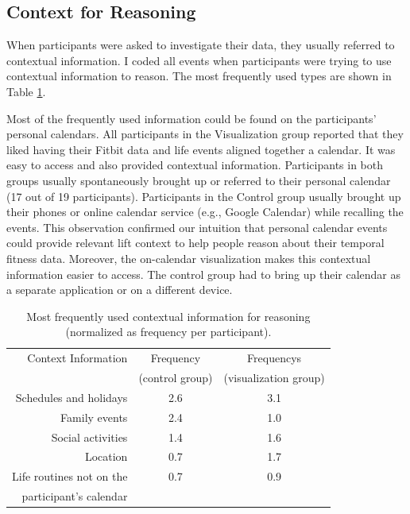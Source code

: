 \documentclass[12pt,oneside]{book}
\begin{document}
\subsection{Context for Reasoning}
When participants were asked to investigate their data, they usually referred to contextual information. I coded all events when participants were trying to use contextual information to reason. The most frequently used types are shown in Table \ref{table:context_use}.

Most of the frequently used information could be found on the participants' personal calendars. All participants in the Visualization group reported that they liked having their Fitbit data and life events aligned together a calendar. It was easy to access and also provided contextual information. Participants in both groups usually spontaneously brought up or referred to their personal calendar (17 out of 19 participants). Participants in the Control group usually brought up their phones or online calendar service (e.g., Google Calendar) while recalling the events. This observation confirmed our intuition that personal calendar events could provide relevant lift context to help people reason about their temporal fitness data. Moreover, the on-calendar visualization makes this contextual information easier to access. The control group had to bring up their calendar as a separate application or on a different device.

\begin{table} [h]
\begin{center}
\begin{tabular}{|r|c|c|}
\hline
 Context Information   &  Frequency  &  Frequencys   \\
  &  (control group) & (visualization group)  \\
  
 \hline
 Schedules and holidays  &  	2.6  &  	3.1 \\
 \hline
 Family events  &  	2.4  &  	1.0 \\
 \hline
 Social activities  &  	1.4  &  	1.6 \\
 \hline
 Location  &  	0.7  &  	1.7 \\
 \hline
 Life routines not on the  &  	0.7  &  	0.9 \\
 participant’s calendar & & \\

\hline
\end{tabular}
\caption{Most frequently used contextual information for reasoning (normalized as frequency per participant). }
\label{table:context_use}
\end{center}
\end{table}
\end{document}
